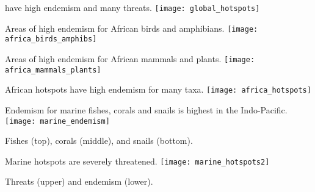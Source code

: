 \documentclass[t]{beamer}
\begin{document}
\begin{frame}[plain]{ have high endemism and many threats.}
	\centering%
		\texttt{[image: global\_hotspots]}\\
\end{frame}

\begin{frame}[plain]{Areas of high endemism for African birds and amphibians.}
	\centering%
		\texttt{[image: africa\_birds\_amphibs]}\\
\end{frame}

\begin{frame}[plain]{Areas of high endemism for African mammals and plants.}
	\centering%
		\texttt{[image: africa\_mammals\_plants]}\\
\end{frame}

\begin{frame}[plain]{African hotspots have high endemism for many taxa.}
	\centering
		\texttt{[image: africa\_hotspots]}\\
\end{frame}

\begin{frame}[plain]{Endemism for marine fishes, corals and snails is highest in the Indo-Pacific.}
	\centering
		\texttt{[image: marine\_endemism]}
		
	Fishes (top), corals (middle), and snails (bottom).
\end{frame}

\begin{frame}[plain]{Marine hotspots are severely threatened.}
	\centering
		\texttt{[image: marine\_hotspots2]}

	Threats (upper) and endemism (lower).
		
\end{frame}

{
\begin{frame}[plain]
\end{frame}
}
\end{document}
